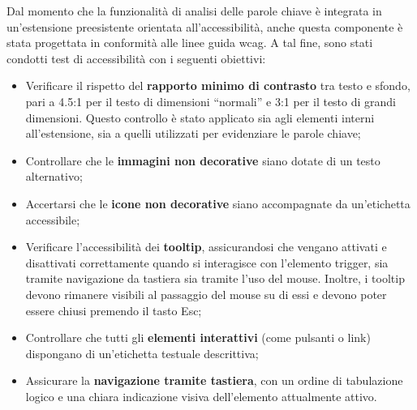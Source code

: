 \par Dal momento che la funzionalità di analisi delle parole chiave è integrata in un’estensione preesistente orientata all’accessibilità, anche questa componente è stata progettata in conformità alle linee guida \gls{wcag}. A tal fine, sono stati condotti test di accessibilità con i seguenti obiettivi:
\begin{itemize}
  \item Verificare il rispetto del \textbf{rapporto minimo di contrasto} tra testo e sfondo, pari a 4.5:1 per il testo di dimensioni “normali” e 3:1 per il testo di grandi dimensioni. Questo controllo è stato applicato sia agli elementi interni all’estensione, sia a quelli utilizzati per evidenziare le parole chiave;
  \item Controllare che le \textbf{immagini non decorative} siano dotate di un testo alternativo;
  \item Accertarsi che le \textbf{icone non decorative} siano accompagnate da un’etichetta accessibile;
  \item Verificare l’accessibilità dei \textbf{tooltip}, assicurandosi che vengano attivati e disattivati correttamente quando si interagisce con l’elemento trigger, sia tramite navigazione da tastiera sia tramite l’uso del mouse. Inoltre, i tooltip devono rimanere visibili al passaggio del mouse su di essi e devono poter essere chiusi premendo il tasto Esc;
  \item Controllare che tutti gli \textbf{elementi interattivi} (come pulsanti o link) dispongano di un’etichetta testuale descrittiva;
  \item Assicurare la \textbf{navigazione tramite tastiera}, con un ordine di tabulazione logico e una chiara indicazione visiva dell’elemento attualmente attivo.
\end{itemize}
